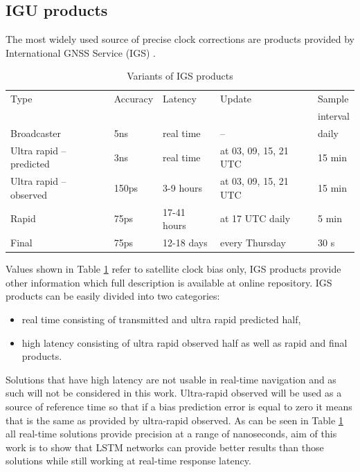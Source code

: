\subsection{IGU products}
The most widely used source of precise clock corrections are products provided 
by International GNSS Service (IGS) \cite{Kouba2009}.
\begin{table}[htb] 
	\centering
	\caption{Variants of IGS products}
	\label{tab:igs_products}
	\begin{tabular*}{\textwidth}{*{5}{l}}
		\hline
		\hline
		Type& Accuracy& Latency& Update& Sample \\
		&&&&interval\\
		\hline
		Broadcaster & 5ns & real time & -- & daily  \\
		Ultra rapid -- predicted & 3ns & real time & at 03, 09, 15, 21 UTC & 15 min  \\
		Ultra rapid -- observed & 150ps & 3-9 hours & at 03, 09, 15, 21 UTC & 15 min  \\
		Rapid & 75ps & 17-41 hours & at 17 UTC daily & 5 min \\
		Final & 75ps & 12-18 days & every Thursday & 30 s \\
		\hline
		\hline
	\end{tabular*}
\end{table}
Values shown in Table \ref{tab:igs_products} refer to satellite clock bias only,  IGS products
provide other information which full description  is available at online repository. 
IGS products can be easily divided into two categories:
\begin{itemize}
	\item real time consisting of transmitted and ultra rapid predicted half,
	\item high latency consisting of ultra rapid observed half as well as rapid and final products.
\end{itemize}
Solutions that have high latency are not usable in real-time navigation and as such will not be
considered in this work. Ultra-rapid observed will be used as a source of
reference time so that if a bias prediction error is equal to zero it means that is
the same as provided by ultra-rapid observed.
As can be seen in Table \ref{tab:igs_products} all real-time solutions provide precision 
at a range of nanoseconds, aim of this work is to show that LSTM networks can provide 
better results than those solutions while still working at real-time response latency.

